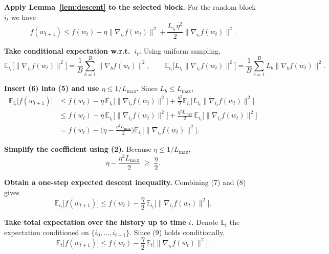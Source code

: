 \documentclass{article}
\begin{document}
\begin{enumerate}[label=\textbf{[Step \arabic*]}]
\item \textbf{Apply Lemma~\ref{lem:descent} to the selected block.}  
For the random block $i_{t}$ we have
\[
f(w_{t+1})
\le f(w_{t}) -\eta\big\|\nabla_{i_{t}}f(w_{t})\big\|^{2}
+ \frac{L_{i_{t}}\eta^{2}}{2}\big\|\nabla_{i_{t}}f(w_{t})\big\|^{2}.
\tag{5}
\]

\item \textbf{Take conditional expectation w.r.t.\ $i_{t}$.}  
Using uniform sampling,
\[
\mathbb{E}_{i_{t}}\!\big[\|\nabla_{i_{t}}f(w_{t})\|^{2}\big]
= \frac{1}{B}\sum_{b=1}^{B}\|\nabla_{b}f(w_{t})\|^{2},
\qquad
\mathbb{E}_{i_{t}}\!\big[L_{i_{t}}\|\nabla_{i_{t}}f(w_{t})\|^{2}\big]
= \frac{1}{B}\sum_{b=1}^{B}L_{b}\|\nabla_{b}f(w_{t})\|^{2}.
\tag{6}
\]

\item \textbf{Insert (6) into (5) and use $\eta\le 1/L_{\max}$.}  
Since $L_{b}\le L_{\max}$,
\[
\begin{aligned}
\mathbb{E}_{i_{t}}\!\big[f(w_{t+1})\big]
&\le f(w_{t}) -\eta\,\mathbb{E}_{i_{t}}\!\big[\|\nabla_{i_{t}}f(w_{t})\|^{2}\big]
   +\frac{\eta^{2}}{2}\mathbb{E}_{i_{t}}\!\big[L_{i_{t}}\|\nabla_{i_{t}}f(w_{t})\|^{2}\big]\\
&\le f(w_{t}) -\eta\,\mathbb{E}_{i_{t}}\!\big[\|\nabla_{i_{t}}f(w_{t})\|^{2}\big]
   +\frac{\eta^{2}L_{\max}}{2}\,\mathbb{E}_{i_{t}}\!\big[\|\nabla_{i_{t}}f(w_{t})\|^{2}\big]\\
&= f(w_{t}) -\Big(\eta-\frac{\eta^{2}L_{\max}}{2}\Big)
   \mathbb{E}_{i_{t}}\!\big[\|\nabla_{i_{t}}f(w_{t})\|^{2}\big].
\end{aligned}
\tag{7}
\]

\item \textbf{Simplify the coefficient using (2).}  
Because $\eta\le 1/L_{\max}$,
\[
\eta-\frac{\eta^{2}L_{\max}}{2}
\;\ge\;
\frac{\eta}{2}.
\tag{8}
\]

\item \textbf{Obtain a one‑step expected descent inequality.}  
Combining (7) and (8) gives
\[
\mathbb{E}_{i_{t}}\!\big[f(w_{t+1})\big]
\le f(w_{t}) -\frac{\eta}{2}\,
      \mathbb{E}_{i_{t}}\!\big[\|\nabla_{i_{t}}f(w_{t})\|^{2}\big].
\tag{9}
\]

\item \textbf{Take total expectation over the history up to time $t$.}  
Denote $\mathbb{E}_{t}$ the expectation conditioned on $\{i_{0},\dots ,i_{t-1}\}$.  
Since (9) holds conditionally,
\[
\mathbb{E}_{t}\!\big[f(w_{t+1})\big]
\le f(w_{t}) -\frac{\eta}{2}\,
      \mathbb{E}_{t}\!\big[\|\nabla_{i_{t}}f(w_{t})\|^{2}\big].
\tag{10}
\]


\end{enumerate}
\end{document}
